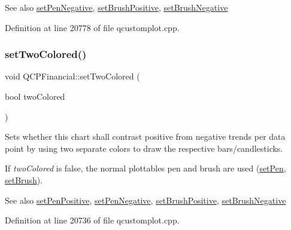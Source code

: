 \begin{DoxySeeAlso}{See also}
\hyperlink{class_q_c_p_financial_afe5c07e94ccea01a75b3a2476993c346}{set\+Pen\+Negative}, \hyperlink{class_q_c_p_financial_a5ebff2b1764efd07cc44942e67821829}{set\+Brush\+Positive}, \hyperlink{class_q_c_p_financial_a8bbdd87629f9144b3ef51af660c0961a}{set\+Brush\+Negative} 
\end{DoxySeeAlso}


Definition at line 20778 of file qcustomplot.\+cpp.

\mbox{\label{class_q_c_p_financial_a138e44aac160a17a9676652e240c5f08}} 
\subsubsection{\texorpdfstring{set\+Two\+Colored()}{setTwoColored()}}
{\footnotesize\ttfamily void Q\+C\+P\+Financial\+::set\+Two\+Colored (\begin{DoxyParamCaption}\item[{bool}]{two\+Colored }\end{DoxyParamCaption})}

Sets whether this chart shall contrast positive from negative trends per data point by using two separate colors to draw the respective bars/candlesticks.

If {\itshape two\+Colored} is false, the normal plottable\textquotesingle{}s pen and brush are used (\hyperlink{class_q_c_p_abstract_plottable_ab74b09ae4c0e7e13142fe4b5bf46cac7}{set\+Pen}, \hyperlink{class_q_c_p_abstract_plottable_a7a4b92144dca6453a1f0f210e27edc74}{set\+Brush}).

\begin{DoxySeeAlso}{See also}
\hyperlink{class_q_c_p_financial_ac58aa3adc7a35aab0088764b840683e5}{set\+Pen\+Positive}, \hyperlink{class_q_c_p_financial_afe5c07e94ccea01a75b3a2476993c346}{set\+Pen\+Negative}, \hyperlink{class_q_c_p_financial_a5ebff2b1764efd07cc44942e67821829}{set\+Brush\+Positive}, \hyperlink{class_q_c_p_financial_a8bbdd87629f9144b3ef51af660c0961a}{set\+Brush\+Negative} 
\end{DoxySeeAlso}


Definition at line 20736 of file qcustomplot.\+cpp.

\mbox{\label{class_q_c_p_financial_a99633f8bac86a61d534ae5eeb1a3068f}} 

